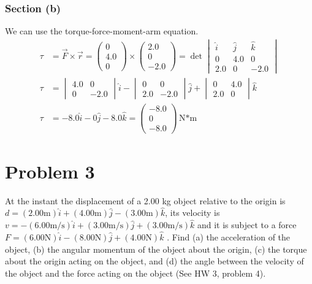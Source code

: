 \documentclass[12pt]{article}
\begin{document}
\subsubsection{Section (b)}
We can use the torque-force-moment-arm equation.
\begin{align}
    \tau    &=  \vec{F} \times \vec{r}
        =   \begin{pmatrix} 0 \\ 4.0 \\ 0 \end{pmatrix} \times \begin{pmatrix} 2.0 \\ 0 \\ -2.0 \end{pmatrix}
        =   \det\begin{vmatrix}
            \hat{i} &\hat{j}&\hat{k}\\
            0       &4.0    &0      \\
            2.0     &0      &-2.0
        \end{vmatrix}\\
    \tau    &=  \begin{vmatrix}4.0&0\\0&-2.0\end{vmatrix}\hat{i} - 
                \begin{vmatrix}0&0\\2.0&-2.0\end{vmatrix}\hat{j} + 
                \begin{vmatrix}0&4.0\\2.0&0\end{vmatrix}\hat{k}\\
    \tau    &=  -8.0\hat{i} - 0\hat{j} - 8.0\hat{k}
        =   \boxed{\begin{pmatrix}-8.0\\0\\-8.0\end{pmatrix}\unit{\newton*\meter}}
\end{align}

\pagebreak
\section{Problem 3}
At the instant the displacement of a 2.00 kg object relative to the origin is \(d = (2.00 \unit{\meter})\hat{i} + (4.00 \unit{\meter})\hat{j} - (3.00 \unit{\meter})\hat{k}\), its velocity is \(v = -(6.00 \unit{\meter/\second})\hat{i} + (3.00 \unit{\meter/\second})\hat{j} + (3.00 \unit{\meter/\second})\hat{k}\) and it is subject to a force \(F = (6.00 \unit{\newton})\hat{i} - (8.00 \unit{\newton})\hat{j} + (4.00 \unit{\newton})\hat{k}\) . Find (a) the acceleration of the object, (b) the angular momentum of the object about the origin, (c) the torque about the origin acting on the object, and (d) the angle between the velocity of the object and the force acting on the object (See HW 3, problem 4).
\end{document}
